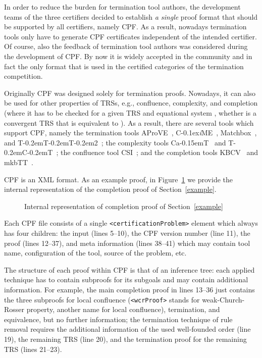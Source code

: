 \documentclass[USenglish]{eptcs}
\newcommand\aprove{\textsf{AProVE}\xspace}
\newcommand\matchbox{\textsf{Matchbox}\xspace}
\newcommand\cime{\textsf{C\kern-0.1ex\textsl{i}ME}\xspace}
\newcommand\tttt{\textsf{T\kern-0.2em\raisebox{-0.3em}T\kern-0.2emT\kern-0.2em\raisebox{-0.3em}2}\xspace}
\newcommand{\csi}{\textsf{CSI}\xspace}
\newcommand\tct{\textsf{T\kern-0.2em\raisebox{-0.3em}C\kern-0.2emT}\xspace}
\newcommand{\cat}{\textsf{C\raisebox{0.15em}a\kern-0.15emT}\xspace}
\newcommand{\kbcv}{\textsf{KBCV}\xspace}
\newcommand{\mkbtt}{\textsf{mkbTT}\xspace}
\newlength{\len}
\newcommand{\rSC}[1]{Section~\ref{#1}}
\newcommand{\rFI}[1]{Figure~\ref{#1}}
\begin{document}
In order to reduce the burden for termination tool authors, the development
teams of the three certifiers decided to establish \emph{a single} proof
format that should be supported by all certifiers, namely CPF.  As a result,
nowadays termination tools only have to generate CPF certificates independent of
the intended certifier.  Of course, also the feedback of termination tool
authors was considered during the development of CPF. By now it is widely
accepted in the community and in fact the only format that is used in the
certified categories of the termination competition. 

Originally CPF was designed solely for termination proofs. Nowadays, it can also
be used for other properties of TRSs, e.g., confluence, complexity, and
completion (where it has to be checked for a given TRS  and equational
system , whether  is a convergent TRS that is equivalent to ). As
a result, there are several tools which support CPF, namely the termination
tools
\aprove~\cite{aprove},
\cime~\cite{a3pat-cime},
\matchbox~\cite{matchbox}, and
\tttt~\cite{ttt2};
the complexity tools
\cat~\cite{cat} and \tct~\cite{tct};
the confluence tool \csi~\cite{csi};
and the completion tools \kbcv~\cite{kbcv} and \mkbtt~\cite{mkbtt}.

CPF is an XML format. As an example proof, in \rFI{xml} we provide the internal representation of
the completion proof of \rSC{example}.
\begin{figure}

\caption{Internal representation of completion proof of \rSC{example}}\label{xml}
\end{figure}
Each CPF file consists of a single \lstinline!<certificationProblem>! element which 
always has four children: 
the input (lines 5--10), the CPF version number
(line 11), the proof (lines 12--37), and meta information (lines 38--41) which may contain
tool name, configuration of the tool, source of the problem, etc. 

The structure of each proof within CPF is that of an inference tree: each applied technique 
has to contain subproofs for its subgoals and may contain additional information.
For example, the main completion proof in lines 13--36 just contains the three subproofs 
for local confluence (\lstinline!<wcrProof>! stands for weak-Church-Rosser property, another name 
for local confluence), termination, and
equivalence, but no further information; the termination technique of rule removal requires
the additional information of the used well-founded order (line 19), the remaining
TRS (line 20), and the termination proof for the remaining TRS (lines 21--23).
\end{document}
